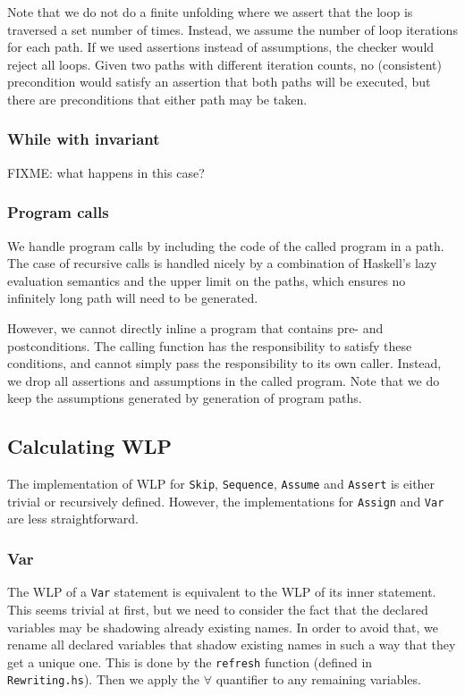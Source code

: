 \documentclass[a4paper]{article}
\begin{document}
Note that we do not do a finite unfolding where we assert that the loop is
traversed a set number of times. Instead, we assume the number of loop
iterations for each path. If we used assertions instead of assumptions, the
checker would reject all loops. Given two paths with different iteration counts,
no (consistent) precondition would satisfy an assertion that both paths will
be executed, but there are preconditions that either path may be taken.

\subsubsection*{While with invariant}

FIXME: what happens in this case?

\subsubsection*{Program calls}

We handle program calls by including the code of the called program in a path.
The case of recursive calls is handled nicely by a combination of Haskell's
lazy evaluation semantics and the upper limit on the paths, which ensures no
infinitely long path will need to be generated.

However, we cannot directly inline a program that contains pre- and
postconditions. The calling function has the responsibility to satisfy these
conditions, and cannot simply pass the responsibility to its own caller.
Instead, we drop all assertions and assumptions in the called program. Note
that we do keep the assumptions generated by generation of program paths.

\subsection{Calculating WLP}

The implementation of WLP for \texttt{Skip}, \texttt{Sequence}, \texttt{Assume}
and \texttt{Assert} is either trivial or recursively defined. However, the
implementations for \texttt{Assign} and \texttt{Var} are less straightforward.

\subsubsection*{Var}

The WLP of a \texttt{Var} statement is equivalent to the WLP of its inner
statement. This seems trivial at first, but we need to consider the fact that
the declared variables may be shadowing already existing names. In order to
avoid that, we rename all declared variables that shadow existing names in
such a way that they get a unique one. This is done by the \texttt{refresh}
function (defined in \texttt{Rewriting.hs}). Then we apply the $\forall$
quantifier to any remaining variables.
\end{document}
